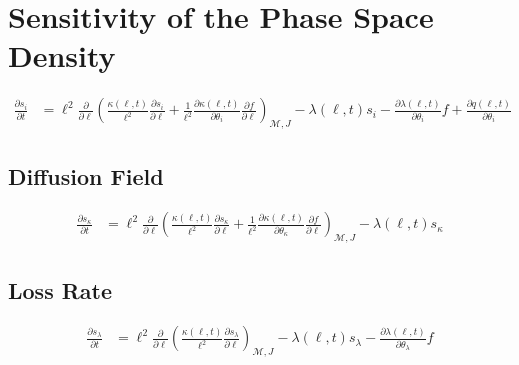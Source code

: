 \section*{Sensitivity of the Phase Space Density}

\begin{equation}\label{eq:psdSensitivity}
    \begin{aligned}
        \frac{\partial{s_i}}{\partial{t}} &= \ell^2 \frac{\partial}{\partial{\ell}} \left( 
            \frac{\kappa(\ell, t)}{\ell^{2}} \frac{\partial{s_i}}{\partial{\ell}} +
            \frac{1}{\ell^{2}} \frac{\partial{\kappa(\ell, t)}}{\partial{\theta_i}} 
            \frac{\partial{f}}{\partial{\ell}}
        \right)_{\mathcal{M}, J}
         - \lambda(\ell, t) s_i - \frac{\partial{\lambda}(\ell, t)}{\partial{\theta_i}} f
         + \frac{\partial{q}(\ell, t)}{\partial{\theta_i}}
    \end{aligned}
\end{equation}

\subsection*{Diffusion Field}

\begin{equation}\label{eq:psdSensitivityDiff}
    \begin{aligned}
        \frac{\partial{s_{\kappa}}}{\partial{t}} &= \ell^2 \frac{\partial}{\partial{\ell}} \left( 
            \frac{\kappa(\ell, t)}{\ell^{2}} \frac{\partial{s_{\kappa}}}{\partial{\ell}} +
            \frac{1}{\ell^{2}} \frac{\partial{\kappa(\ell, t)}}{\partial{\theta_{\kappa}}} 
            \frac{\partial{f}}{\partial{\ell}}
        \right)_{\mathcal{M}, J}
         - \lambda(\ell, t) s_{\kappa}
    \end{aligned}
\end{equation}

\subsection*{Loss Rate}

\begin{equation}\label{eq:psdSensitivityLambda}
    \begin{aligned}
        \frac{\partial{s_{\lambda}}}{\partial{t}} &= \ell^2 \frac{\partial}{\partial{\ell}} \left( 
            \frac{\kappa(\ell, t)}{\ell^{2}} \frac{\partial{s_{\lambda}}}{\partial{\ell}} 
        \right)_{\mathcal{M}, J}
         - \lambda(\ell, t) s_{\lambda}
         - \frac{\partial\lambda(\ell, t)}{\partial{\theta_{\lambda}}} f
    \end{aligned}
\end{equation}


